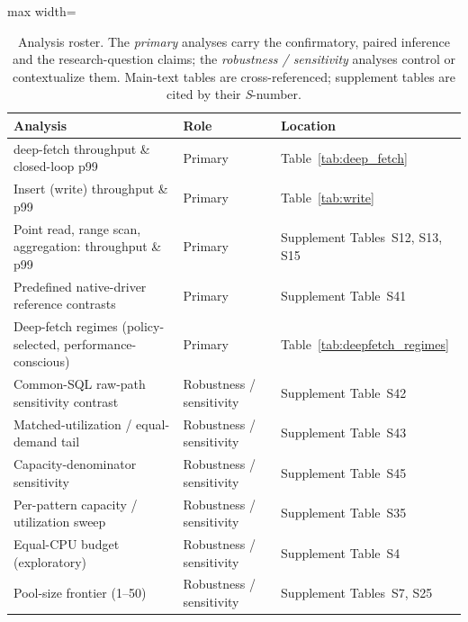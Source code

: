 \begin{table}[htbp]
  \centering
  \small
  \caption{Analysis roster. The \emph{primary} analyses carry the confirmatory,
    paired inference and the research-question claims; the \emph{robustness /
    sensitivity} analyses control or contextualize them. Main-text tables are
    cross-referenced; supplement tables are cited by their \textsl{S}-number.}
  \label{tab:analysis_roster}
  \begin{adjustbox}{max width=\textwidth}
  \begin{tabular}{@{}l l l@{}}
    \toprule
    Analysis & Role & Location \\
    \midrule
    deep-fetch throughput \& closed-loop p99      & Primary & Table~\ref{tab:deep_fetch} \\
    Insert (write) throughput \& p99                     & Primary & Table~\ref{tab:write} \\
    Point read, range scan, aggregation: throughput \& p99 & Primary & Supplement Tables~S12, S13, S15 \\
    Predefined native-driver reference contrasts         & Primary & Supplement Table~S41 \\
    Deep-fetch regimes (policy-selected, performance-conscious) & Primary & Table~\ref{tab:deepfetch_regimes} \\
    \midrule
    Common-SQL raw-path sensitivity contrast                       & Robustness / sensitivity & Supplement Table~S42 \\
    Matched-utilization / equal-demand tail              & Robustness / sensitivity & Supplement Table~S43 \\
    Capacity-denominator sensitivity                     & Robustness / sensitivity & Supplement Table~S45 \\
    Per-pattern capacity / utilization sweep             & Robustness / sensitivity & Supplement Table~S35 \\
    Equal-CPU budget (exploratory)                       & Robustness / sensitivity & Supplement Table~S4 \\
    Pool-size frontier (1--50)                           & Robustness / sensitivity & Supplement Tables~S7, S25 \\

\end{tabular}
\end{adjustbox}
\end{table}
